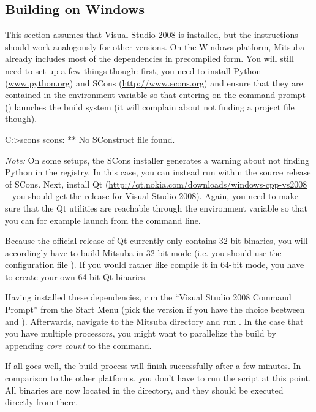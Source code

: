 \subsection{Building on Windows}
This section assumes that Visual Studio 2008 is installed, but the instructions should work analogously for other versions.
On the Windows platform, Mitsuba already includes most of the dependencies in precompiled form.
You will still need to set up a few things though: first, you need to install Python 
(\url{www.python.org}) and SCons (\url{http://www.scons.org}) and ensure that they are contained
in the  environment variable so that entering  on the command prompt
() launches the build system (it will complain about not finding a project file though).
\begin{shell}
C:\Users\Wenzel>scons
scons: ** No SConstruct file found.
\end{shell}
\emph{Note: }On some setups, the SCons installer generates a warning about not finding Python in the registry. In this case, you can instead run  within the source release of SCons.
Next, install Qt (\url{http://qt.nokia.com/downloads/windows-cpp-vs2008} -- you should get the release for Visual Studio 2008). Again, you need to make sure that the 
Qt utilities are reachable through the  environment variable so that you can for example launch  from the command line.

Because the official release of Qt currently only contains 32-bit binaries, you will accordingly have to 
build Mitsuba in 32-bit mode (i.e. you should use the configuration file ). If you would rather like compile it in 64-bit mode, you have to create
your own 64-bit Qt binaries.

Having installed these dependencies, run the ``Visual Studio 2008 Command 
Prompt'' from the Start Menu (pick the  version if you have the choice beetween  and ). Afterwards,
navigate to the Mitsuba directory and run . 
In the case that you have multiple processors, you might want to parallelize the build by appending \emph{core count} to the  command.

If all goes well, the build process will finish successfully after a few
minutes. In comparison to the other platforms, you don't have to run the  script at this point. 
All binaries are now located in the  directory, and they should be executed directly from there.


